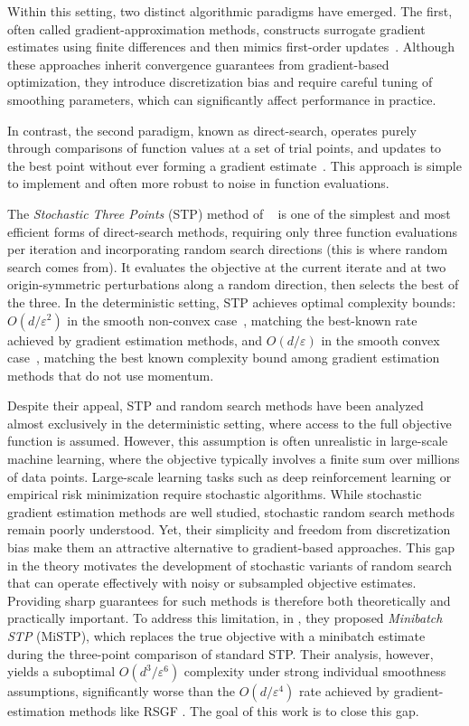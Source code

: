 \documentclass[twoside]{article}
\theoremstyle{plain}
\theoremstyle{definition}
\theoremstyle{remark}
\begin{document}
Within this setting, two distinct algorithmic paradigms have emerged. The first, often called gradient-approximation methods, constructs surrogate gradient estimates using finite differences and then mimics first-order updates~\cite{nesterov2017random, ghadimi2013stochastic, liu2018zeroth}. Although these approaches inherit convergence guarantees from gradient-based optimization, they introduce discretization bias and require careful tuning of smoothing parameters, which can significantly affect performance in practice.

In contrast, the second paradigm, known as direct-search, operates purely through comparisons of function values at a set of trial points, and updates to the best point without ever forming a gradient estimate~\cite{bergou2020stochastic, golovin2020gradientless}. This approach is simple to implement and often more robust to noise in function evaluations.



The \emph{Stochastic Three Points} (STP) method of ~\cite{bergou2020stochastic} 
is one of the simplest and most efficient forms of direct-search methods, requiring only three function evaluations 
per iteration and incorporating random search directions (this is where random search comes from). It evaluates the objective at the current iterate and at two origin-symmetric perturbations along a random direction, then selects the best of the three. In the deterministic setting, STP achieves optimal complexity bounds: $O(d/\varepsilon^2)$ in the smooth non-convex case~\cite{bergou2020stochastic}, matching the best-known rate achieved by gradient estimation methods, and $O(d/\varepsilon)$ in the smooth convex case~\cite{kadi2025on}, matching the best known complexity bound among gradient estimation methods that do not use momentum. 

Despite their appeal, STP and random search methods have been analyzed almost exclusively in the deterministic setting, where access to the full objective function is assumed. However, this assumption is often unrealistic in large-scale machine learning, where the objective typically involves a finite sum over millions of data points. Large-scale learning tasks such as deep reinforcement learning or empirical risk minimization require stochastic algorithms. While stochastic gradient estimation methods are well studied, stochastic random search methods remain poorly understood. Yet, their simplicity and freedom from discretization bias make them an attractive alternative to gradient-based approaches. This gap in the theory motivates the development of stochastic variants of random search that can operate effectively with noisy or subsampled objective estimates. Providing sharp guarantees for such methods is therefore both theoretically and practically important. To address this limitation, in \cite{boucherouite2024mistp}, they proposed \emph{Minibatch STP} (MiSTP), which replaces the true objective with a minibatch estimate during the three-point comparison of standard STP. Their analysis, however, yields a suboptimal $O(d^3/\varepsilon^6)$ complexity under strong individual smoothness assumptions, significantly worse than the $O(d/\varepsilon^4)$ rate achieved by gradient-estimation methods like RSGF \cite{ghadimi2013stochastic}. The goal of this work is to close this gap.
\end{document}
